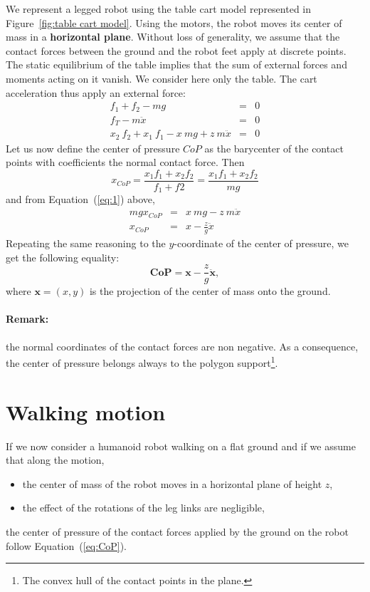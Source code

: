 \documentclass{article}
\newcommand\vect[1]{\mathbf{#1}}
\newcommand\x{\vect{x}}
\newcommand\ddx{\vect{\ddot{x}}}
\begin{document}
We represent a legged robot using the table cart model represented in Figure~\ref{fig:table cart model}. Using the motors, the robot moves its center of mass in a \textbf{horizontal plane}. Without loss of generality, we assume that the contact forces between the ground and the robot feet apply at discrete points. The static equilibrium of the table implies that the sum of external forces and moments acting on it vanish. We consider here only the table. The cart acceleration thus apply an external force:
\begin{eqnarray}
  f_1 + f_2 - mg &=& 0 \\
  f_T - m\ddot{x} &=& 0 \\
  \label{eq:1}
  x_2\ f_2 + x_1\ f_1 - x\ mg + z\ m\ddot{x} &=& 0
\end{eqnarray}
Let us now define the center of pressure $CoP$ as the barycenter of the contact points with coefficients the normal contact force. Then
$$
x_{CoP} = \frac{x_1 f_1 + x_2 f_2}{f_1+f2} = \frac{x_1 f_1 + x_2 f_2}{mg}
$$
and from Equation~(\ref{eq:1}) above,
\begin{eqnarray}
  mg x_{CoP} &=&  x\ mg - z\ m\ddot{x}\\
  x_{CoP} &=& x - \frac{z}{g}\ddot{x}
\end{eqnarray}
Repeating the same reasoning to the $y$-coordinate of the center of pressure, we get the following equality:
\begin{equation}\label{eq:CoP}
  \vect{CoP} = \x - \frac{z}{g}\ddx,
\end{equation}
where $\x=(x,y)$ is the projection of the center of mass onto the ground.

\paragraph{Remark:} the normal coordinates of the contact forces are non negative. As a consequence, the center of pressure belongs always to the polygon support\footnote{The convex hull of the contact points in the plane.}.

\section{Walking motion}

If we now consider a humanoid robot walking on a flat ground and if we assume that along the motion,
\begin{itemize}
\item the center of mass of the robot moves in a horizontal plane of height $z$,
\item the effect of the rotations of the leg links are negligible,
\end{itemize}
the center of pressure of the contact forces applied by the ground on the robot follow Equation~(\ref{eq:CoP}).
\end{document}
